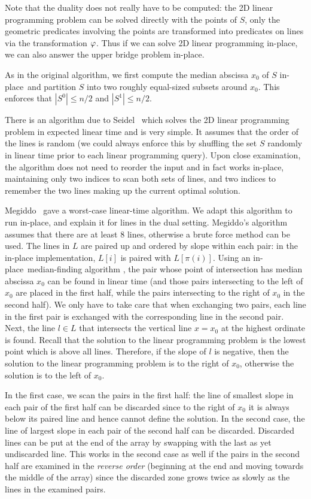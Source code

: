 \documentclass{elsart}
\newcommand{\inplace}{in-place}
\begin{document}
Note that the duality does not really have to be computed: the 2D
linear programming problem can be solved directly with the points of
$S$, only the geometric predicates involving the points are
transformed into predicates on lines via the transformation $\varphi$.
Thus if we can solve 2D linear programming \inplace, we can also
answer the upper bridge problem in-place.

As in the original algorithm, we first compute the median abscissa
$x_0$ of $S$ \inplace\ and partition $S$ into two roughly equal-sized
subsets around $x_0$.  This enforces that $|S^0|\leq n/2$ and
$|S^1|\leq n/2$.

There is an algorithm due to Seidel~\cite{s91} which solves the 2D
linear programming problem in expected linear time and is very
simple. It assumes that the order of the lines is random (we could
always enforce this by shuffling the set $S$ randomly in linear time
prior to each linear programming query). Upon close examination, the
algorithm does not need to reorder the input and in fact works
\inplace, maintaining only two indices to scan both sets of lines, and
two indices to remember the two lines making up the current optimal
solution.

Megiddo~\cite{m84} gave a worst-case linear-time algorithm. We adapt
this algorithm to run \inplace, and explain it for lines in the dual
setting.  Megiddo's algorithm assumes that there are at least 8 lines,
otherwise a brute force method can be used. The lines in $L$ are
paired up and ordered by slope within each pair: in the in-place
implementation, $L[i]$ is paired with $L[\pi(i)]$.  Using an \inplace\
median-finding algorithm \cite{lw88}, the pair whose point of
intersection has median abscissa $x_0$ can be found in linear time
(and those pairs intersecting to the left of $x_0$ are placed in the
first half, while the pairs intersecting to the right of $x_0$ in the
second half).  We only have to take care that when exchanging two
pairs, each line in the first pair is exchanged with the corresponding
line in the second pair.  Next, the line $l\in L$ that intersects the
vertical line $x=x_0$ at the highest ordinate is found.  Recall that
the solution to the linear programming problem is the lowest point
which is above all lines.  Therefore, if the slope of $l$ is negative,
then the solution to the linear programming problem is to the right of
$x_0$, otherwise the solution is to the left of $x_0$.

In the first case, we scan the pairs in the first half: the line of
smallest slope in each pair of the first half can be discarded since
to the right of $x_0$ it is always below its paired line and hence
cannot define the solution. In the second case, the line of largest
slope in each pair of the second half can be discarded.  Discarded
lines can be put at the end of the array by swapping with the last as
yet undiscarded line. This works in the second case as well if the
pairs in the second half are examined in the \emph{reverse order}
(beginning at the end and moving towards the middle of the array)
since the discarded zone grows twice as slowly as the lines in the
examined pairs.
\end{document}
